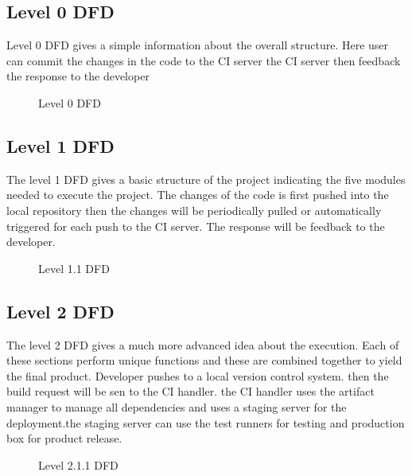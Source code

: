 \documentclass[12pt,a4paper,oneside]{report}
\begin{document}
{\newpage
\subsection{Level 0 DFD}
Level 0 DFD gives a simple information about the overall structure. Here user can commit the changes in the code to the CI server the CI server then feedback the response to the developer
\begin{figure}[h!]
\begin{center}

\hspace{1 in}
\caption{Level 0 DFD}
\end{center}
\end{figure}
\newpage
\subsection{Level 1 DFD}
The level 1 DFD gives a basic structure of the project indicating the five modules needed to execute the project. The changes of the code is first pushed into the local repository then the changes will be periodically pulled or automatically triggered for each push to the CI server. The response will be feedback to the developer.
\begin{figure}[h]
\begin{center}
\hspace{1 in}
\caption{Level 1.1 DFD}
\end{center}
\vspace{-1.5 in}
\end{figure}

\vspace{100pt}
\subsection{Level 2 DFD}
The level 2 DFD gives a much more advanced idea about the execution. Each of these sections perform unique functions and these are combined together to yield the final product. Developer pushes to a local version control system. then the build request will be sen to the CI handler. the CI handler uses the artifact manager to manage all dependencies and uses a staging server for the deployment.the staging server can use the test runners for testing and production box for product release.
\newpage
\begin{figure}[h]
\begin{center}
\vspace{0.5 in}
\hspace{.0 in}
\caption{Level 2.1.1 DFD}
\end{center}


\end{figure}}
\end{document}

